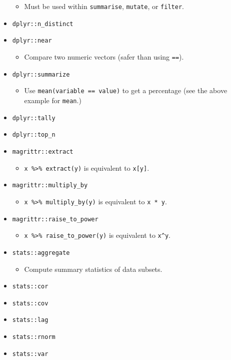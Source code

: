 \documentclass[
]{book}
\providecommand{\tightlist}{%
  \setlength{\itemsep}{0pt}\setlength{\parskip}{0pt}}
\begin{document}
\begin{itemize}
  \begin{itemize}
  \tightlist
  \item
    Must be used within \texttt{summarise}, \texttt{mutate}, or \texttt{filter}.
  \end{itemize}
\item
  \texttt{dplyr::n\_distinct}
\item
  \texttt{dplyr::near}

  \begin{itemize}
  \tightlist
  \item
    Compare two numeric vectors (safer than using \texttt{==}).
  \end{itemize}
\item
  \texttt{dplyr::summarize}

  \begin{itemize}
  \tightlist
  \item
    Use \texttt{mean(variable\ ==\ value)} to get a percentage (see the above example for \texttt{mean}.)
  \end{itemize}
\item
  \texttt{dplyr::tally}
\item
  \texttt{dplyr::top\_n}
\item
  \texttt{magrittr::extract}

  \begin{itemize}
  \tightlist
  \item
    \texttt{x\ \%\textgreater{}\%\ extract(y)} is equivalent to \texttt{x{[}y{]}}.
  \end{itemize}
\item
  \texttt{magrittr::multiply\_by}

  \begin{itemize}
  \tightlist
  \item
    \texttt{x\ \%\textgreater{}\%\ multiply\_by(y)} is equivalent to \texttt{x\ *\ y}.
  \end{itemize}
\item
  \texttt{magrittr::raise\_to\_power}

  \begin{itemize}
  \tightlist
  \item
    \texttt{x\ \%\textgreater{}\%\ raise\_to\_power(y)} is equivalent to \texttt{x\^{}y}.
  \end{itemize}
\item
  \texttt{stats::aggregate}

  \begin{itemize}
  \tightlist
  \item
    Compute summary statistics of data subsets.
  \end{itemize}
\item
  \texttt{stats::cor}
\item
  \texttt{stats::cov}
\item
  \texttt{stats::lag}
\item
  \texttt{stats::rnorm}
\item
  \texttt{stats::var}
\end{itemize}
\end{document}
